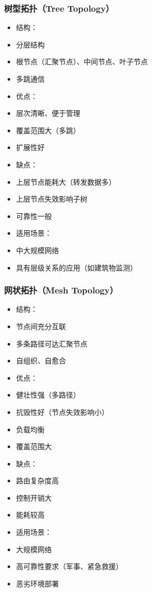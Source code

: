 \documentclass[aspectratio=43]{beamer}
\begin{document}
\begin{frame}
  \frametitle{树型拓扑（Tree Topology）}

  \begin{itemize}
  \item<+-> 结构：
  \item<+-> 分层结构
  \item<+-> 根节点（汇聚节点）、中间节点、叶子节点
  \item<+-> 多跳通信
  \item<+-> 优点：
  \item<+-> 层次清晰、便于管理
  \item<+-> 覆盖范围大（多跳）
  \item<+-> 扩展性好
  \item<+-> 缺点：
  \item<+-> 上层节点能耗大（转发数据多）
  \item<+-> 上层节点失效影响子树
  \item<+-> 可靠性一般
  \item<+-> 适用场景：
  \item<+-> 中大规模网络
  \item<+-> 具有层级关系的应用（如建筑物监测）
  \end{itemize}
\end{frame}

\begin{frame}
  \frametitle{网状拓扑（Mesh Topology）}

  \begin{itemize}
  \item<+-> 结构：
  \item<+-> 节点间充分互联
  \item<+-> 多条路径可达汇聚节点
  \item<+-> 自组织、自愈合
  \item<+-> 优点：
  \item<+-> 健壮性强（多路径）
  \item<+-> 抗毁性好（节点失效影响小）
  \item<+-> 负载均衡
  \item<+-> 覆盖范围大
  \item<+-> 缺点：
  \item<+-> 路由复杂度高
  \item<+-> 控制开销大
  \item<+-> 能耗较高
  \item<+-> 适用场景：
  \item<+-> 大规模网络
  \item<+-> 高可靠性要求（军事、紧急救援）
  \item<+-> 恶劣环境部署
  \end{itemize}
\end{frame}
\end{document}
